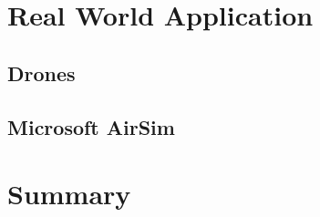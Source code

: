 \section{Real World Application}
\label{c:literaturereview:application}

\subsection {Drones}
\label{c:literaturereview:application:drones}

\subsection {Microsoft AirSim}
\label{c:literaturereview:application:airsim}


\section{Summary}
\label{c:literaturereview:summary}
